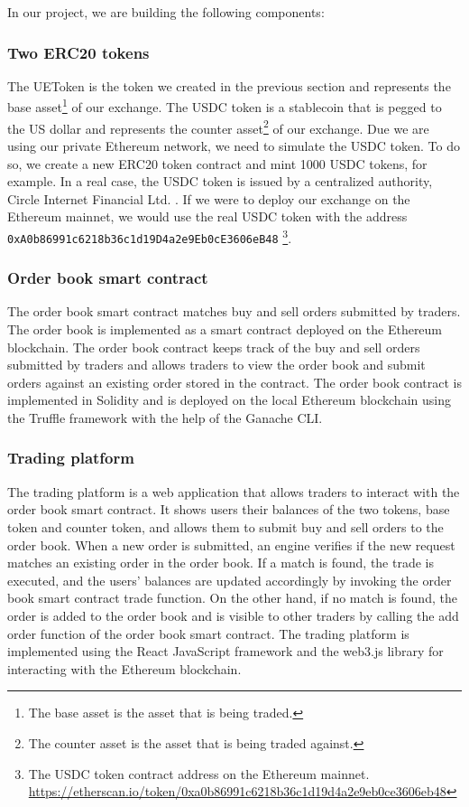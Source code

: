 In our project, we are building the following components:



\subsubsection{Two ERC20 tokens}


The UEToken is the token we created in the previous section and represents
the base asset\footnote{The base asset is the asset that is being traded.} of our exchange. The USDC token is a stablecoin that is pegged to
the US dollar and represents the counter asset\footnote{The counter asset is the asset that is being traded against.} of our exchange. Due we
are using our private Ethereum network, we need to simulate the USDC token. To do so, we create a new ERC20 token contract and mint 1000 USDC
tokens, for example. In a real case, the USDC token is issued by a centralized authority, Circle Internet Financial Ltd. \cite{usdc}. If
we were to deploy our exchange on the Ethereum mainnet, we would use the real USDC token with the address \texttt{0xA0b86991c6218b36c1d19D4a2e9Eb0cE3606eB48}
\footnote{The USDC token contract address on the Ethereum mainnet. \url{https://etherscan.io/token/0xa0b86991c6218b36c1d19d4a2e9eb0ce3606eb48}}.


\subsubsection{Order book smart contract}


The order book smart contract matches buy and sell orders submitted by traders.
The order book is implemented as a smart contract deployed on the Ethereum blockchain. The order book contract keeps track
of the buy and sell orders submitted by traders and allows traders to view the order book and submit orders against an existing order stored
in the contract. The order book contract is implemented in Solidity and is deployed on the local Ethereum blockchain using the Truffle framework with
the help of the Ganache CLI.


\subsubsection{Trading platform}


The trading platform is a web application that allows traders to interact with the order book smart contract. It shows
users their balances of the two tokens, base token and counter token, and allows them to submit buy and sell orders to the order book. When a new order
is submitted, an engine verifies if the new request matches an existing order in the order book. If a match is found, the trade is
executed, and the users' balances are updated accordingly by invoking the order book smart contract trade function. On the other hand, if no match is found, the order
is added to the order book and is visible to other traders by calling the add order function of the order book smart contract. The trading platform is
implemented using the React JavaScript framework and the web3.js library for interacting with the Ethereum blockchain.


